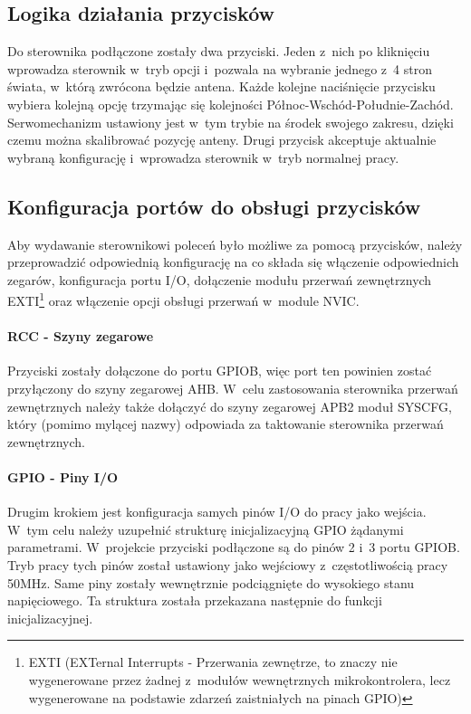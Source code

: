 \documentclass[eng,oneside]{mgr}
\begin{document}
			\subsection{Logika działania przycisków}
			Do sterownika podłączone zostały dwa przyciski. Jeden z~nich po kliknięciu wprowadza sterownik w~tryb opcji i~pozwala na wybranie jednego z~4 stron świata, w~którą zwrócona będzie antena. Każde kolejne naciśnięcie przycisku wybiera kolejną opcję trzymając się kolejności Północ-Wschód-Południe-Zachód. Serwomechanizm ustawiony jest w~tym trybie na środek swojego zakresu, dzięki czemu można skalibrować pozycję anteny. Drugi przycisk akceptuje aktualnie wybraną konfigurację i~wprowadza sterownik w~tryb normalnej pracy.

			\subsection{Konfiguracja portów do obsługi przycisków}
			Aby wydawanie sterownikowi poleceń było możliwe za pomocą przycisków, należy przeprowadzić odpowiednią konfigurację na co składa się włączenie odpowiednich zegarów, konfiguracja portu I/O, dołączenie modułu przerwań zewnętrznych EXTI\footnote{EXTI (EXTernal Interrupts - Przerwania zewnętrze, to znaczy nie wygenerowane przez żadnej z~modułów wewnętrznych mikrokontrolera, lecz wygenerowane na podstawie zdarzeń zaistniałych na pinach GPIO)} oraz włączenie opcji obsługi przerwań w~module NVIC.

				\paragraph{RCC - Szyny zegarowe}
				Przyciski zostały dołączone do portu GPIOB, więc port ten powinien zostać przyłączony do szyny zegarowej AHB. W~celu zastosowania sterownika przerwań zewnętrznych należy także dołączyć do szyny zegarowej APB2 moduł SYSCFG, który (pomimo mylącej nazwy) odpowiada za taktowanie sterownika przerwań zewnętrznych.

				\paragraph{GPIO - Piny I/O}
				Drugim krokiem jest konfiguracja samych pinów I/O do pracy jako wejścia. W~tym celu należy uzupełnić strukturę inicjalizacyjną GPIO żądanymi parametrami. W~projekcie przyciski podłączone są do pinów 2 i~3 portu GPIOB. Tryb pracy tych pinów został ustawiony jako wejściowy z~częstotliwością pracy 50MHz. Same piny zostały wewnętrznie podciągnięte do wysokiego stanu napięciowego. Ta struktura została przekazana następnie do funkcji inicjalizacyjnej.
\end{document}
